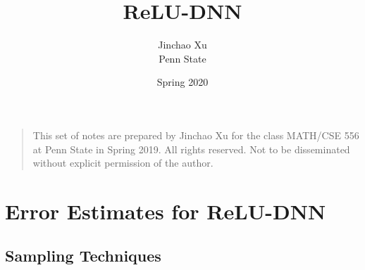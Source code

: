 \documentclass[leqno,labelfig,psfigt]{svmono}
\begin{document}
\title{ReLU-DNN}
\author{Jinchao Xu\\Penn State}
\date{Spring 2020}
\maketitle

\begin{quote} 
This set of notes are prepared by Jinchao Xu for the class MATH/CSE
556 at Penn State in Spring 2019. All rights reserved.  Not to be
disseminated without explicit permission of the author.
\end{quote}
\tableofcontents

\chapter{Error Estimates for ReLU-DNN}
\section{Sampling Techniques}



%

\end{document}
